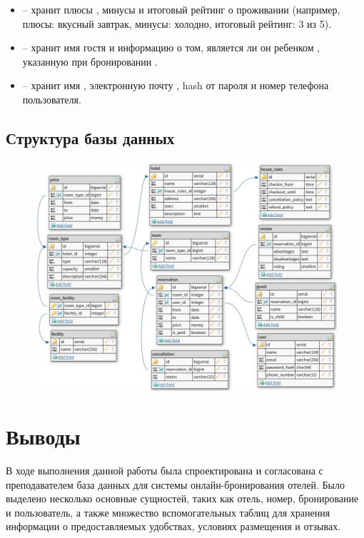 \begin{itemize}
	\item {} -- хранит плюсы , минусы  и итоговый рейтинг  о проживании  (например, плюсы: вкусный завтрак, минусы: холодно, итоговый рейтинг: 3 из 5).
	
	\item {} -- хранит имя гостя  и информацию о том, является ли он ребенком , указанную при бронировании .
	
	\item {} -- хранит имя , электронную почту , hash от пароля  и номер телефона  пользователя.
\end{itemize}

\subsection{Структура базы данных}

\begin{figure}[H]
	\centering
	\includegraphics[width=\linewidth]{scheme}
\end{figure}

\section{Выводы}

В ходе выполнения данной работы была спроектирована и согласована с преподавателем база данных для системы онлайн-бронирования отелей. Было выделено несколько основные сущностей, таких как отель, номер, бронирование и пользователь, а также множество вспомогательных таблиц для хранения информации о предоставляемых удобствах, условиях размещения и отзывах.


